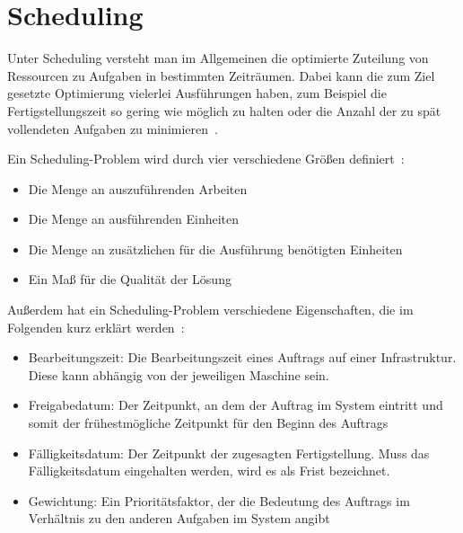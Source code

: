 \section{Scheduling}\label{CAP:scheduling}
Unter Scheduling versteht man im Allgemeinen die optimierte Zuteilung von Ressourcen zu Aufgaben in bestimmten Zeiträumen.
Dabei kann die zum Ziel gesetzte Optimierung vielerlei Ausführungen haben, zum Beispiel die Fertigstellungszeit so gering wie möglich zu halten oder die Anzahl der zu spät vollendeten Aufgaben zu minimieren~\cite{Gawiejnowicz.2020}.

Ein Scheduling-Problem wird durch vier verschiedene Größen definiert~\cite{Gawiejnowicz.2020}:
\begin{itemize}
 \item Die Menge an auszuführenden Arbeiten
 \item Die Menge an ausführenden Einheiten
 \item Die Menge an zusätzlichen für die Ausführung benötigten Einheiten
 \item Ein Maß für die Qualität der Lösung
\end {itemize}
Außerdem hat ein Scheduling-Problem verschiedene Eigenschaften, die im Folgenden kurz erklärt werden~\cite{Pinedo.2022}:
\begin{itemize}
 \item Bearbeitungszeit: Die Bearbeitungszeit eines Auftrags auf einer Infrastruktur. Diese kann abhängig von der jeweiligen Maschine sein.
 \item Freigabedatum: Der Zeitpunkt, an dem der Auftrag im System eintritt und somit der frühestmögliche Zeitpunkt für den Beginn des Auftrags
 \item Fälligkeitsdatum: Der Zeitpunkt der zugesagten Fertigstellung. Muss das Fälligkeitsdatum eingehalten werden, wird es als Frist bezeichnet.
 \item Gewichtung: Ein Prioritätsfaktor, der die Bedeutung des Auftrags im Verhältnis zu den anderen Aufgaben im System angibt
\end{itemize}

